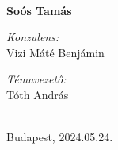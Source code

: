 \begin{titlepage}
	{\Huge  \scshape 
	}\\[0.4em] %
	
	
	\vspace{3em}
	
	{\LARGE \bfseries
		Soós Tamás
	}
	
	\vfill %
	
	
	\begin{minipage}[t]{0.45\textwidth}
	\begin{flushleft}\large
   	\emph{Konzulens:}  \\
    Vizi Máté Benjámin
	\end{flushleft}
	\end{minipage}
	\begin{minipage}[t]{0.45\textwidth}
	\begin{flushright}\large
	\emph{Témavezető:}  \\
	Tóth András
	\\ %
	\end{flushright}
	\end{minipage}\\[3em]
	
	

	{\large
		Budapest, 2024.05.24.}\\[2em] %
	
	
	
	
\end{titlepage}